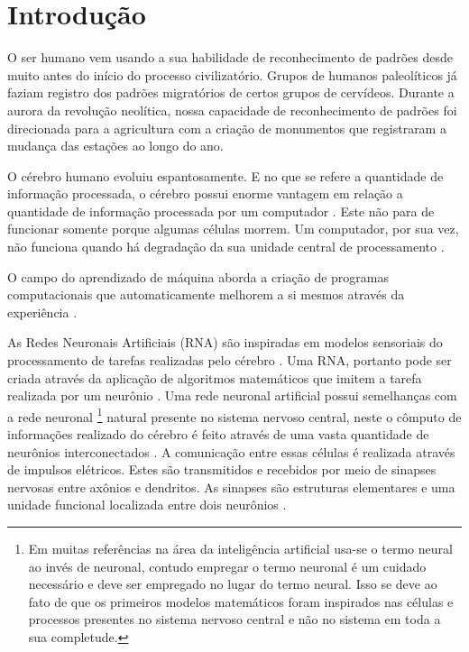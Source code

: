 \chapter{Introdução}

O ser humano vem usando a sua habilidade de reconhecimento de padrões desde  muito antes do início do processo civilizatório. Grupos de humanos paleolíticos já faziam registro dos padrões migratórios de certos grupos de cervídeos. Durante a aurora da revolução neolítica, nossa capacidade de reconhecimento de padrões foi direcionada para a agricultura com a criação de monumentos que registraram a mudança das estações ao longo do ano.

O cérebro humano evoluiu espantosamente. E no que se refere a quantidade de informação processada, o cérebro possui enorme vantagem em relação a quantidade de informação processada por um computador \citep{Hall2014}. Este não para de funcionar somente porque algumas células morrem. Um computador, por sua vez, não funciona quando há degradação da sua unidade central de processamento \citep{Mao1996}.

O campo do aprendizado de máquina aborda a criação de programas computacionais que automaticamente melhorem a si mesmos através da experiência \citep{Michie1994,Levy1997,MacKay2005}. 


As Redes Neuronais Artificiais (RNA) são inspiradas em modelos sensoriais do processamento de tarefas realizadas pelo cérebro \citep{Hagan1996}. Uma RNA, portanto pode ser criada através da aplicação de algoritmos matemáticos que imitem a tarefa realizada por um neurônio \citep{Nedjah2016}. Uma rede neuronal artificial possui semelhanças com a rede neuronal \footnote{ Em muitas referências na área  da inteligência artificial usa-se o termo neural ao invés de neuronal, contudo empregar o termo neuronal é um cuidado necessário e deve ser empregado no lugar do termo neural. Isso se deve ao fato de que os primeiros modelos matemáticos foram inspirados nas células e processos presentes no sistema nervoso central e não no sistema em toda a sua completude.  } natural presente no sistema nervoso central, neste o cômputo de informações realizado do cérebro é feito através de uma vasta quantidade de neurônios interconectados \citep{Feldman1988,Poulton2002}. A comunicação entre essas células é realizada através de impulsos elétricos. Estes são transmitidos e recebidos por meio de sinapses nervosas entre axônios e dendritos. As sinapses são estruturas elementares e uma unidade funcional localizada entre dois neurônios \citep{Krogh2008}. 

